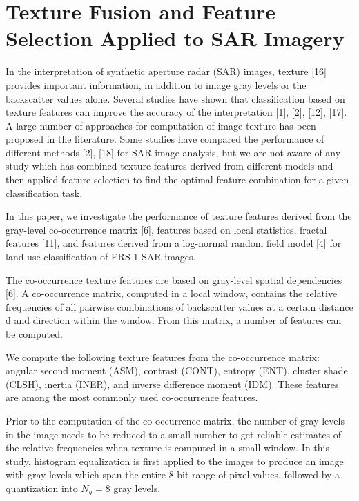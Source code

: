 \documentclass[paper=a4, fontsize=11pt]{scrartcl}
\begin{document}
\newpage

\section*{Texture Fusion and Feature Selection Applied to SAR Imagery}

In the interpretation of synthetic aperture radar (SAR) images, texture [16] provides important information, in addition to image gray levels or the backscatter values alone. 
Several studies have shown that classification based on texture features can improve the accuracy of the interpretation [1], [2], [12], [17]. 
A large number of approaches for computation of image texture has been proposed in the literature. 
Some studies have compared the performance of different methods [2], [18] for SAR image analysis, but we are not aware of any study which has combined texture features derived from different models and then applied feature selection to find the optimal feature combination for a given classification task.

In this paper, we investigate the performance of texture features derived from the gray-level co-occurrence matrix [6], features based on local statistics, fractal features [11], and features derived from a log-normal random field model [4] for land-use classification of ERS-1 SAR images.

The co-occurrence texture features are based on gray-level spatial dependencies [6]. 
A co-occurrence matrix, computed in a local window, contains the relative frequencies of all pairwise combinations of backscatter values at a certain distance d and direction within the window. 
From this matrix, a number of features can be computed.

We compute the following texture features from the co-occurrence matrix: angular second moment (ASM), contrast (CONT), entropy (ENT), cluster shade (CLSH), inertia (INER), and inverse difference moment (IDM). 
These features are among the most commonly used co-occurrence features.

Prior to the computation of the co-occurrence matrix, the number of gray levels in the image needs to be reduced to a small number to get reliable estimates of the relative frequencies when texture is computed in a small window.
In this study, histogram equalization is first applied to the images to produce an image with gray levels which span the entire 8-bit range of pixel values, followed by a quantization into $N_g = 8$ gray levels.
\end{document}
